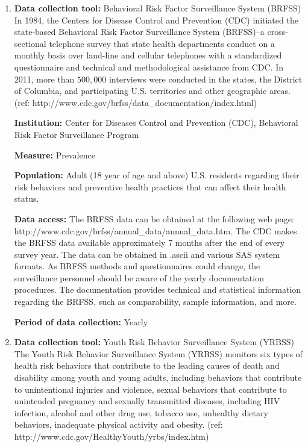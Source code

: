 \documentclass[12pt,letterpaper]{report}
\begin{document}
\begin{enumerate}

\item \textbf{Data collection tool:} Behavioral Risk Factor Surveillance System (BRFSS)  
\\In 1984, the Centers for Disease Control and Prevention (CDC) initiated the state-based Behavioral Risk Factor Surveillance System (BRFSS)--a cross-sectional telephone survey that state health departments conduct on a monthly basis over land-line and cellular telephones with a standardized questionnaire and technical and methodological assistance from CDC. 
	In 2011, more than $500,000$ interviews were conducted in the states, the District of Columbia, and participating U.S. territories and other geographic areas.
(ref: http://www.cdc.gov/brfss/data\_documentation/index.html)
	
	\textbf{Institution:} Center for Diseases Control and Prevention (CDC), Behavioral Risk Factor Surveillance Program
	
	\textbf{Measure:} Prevalence

	\textbf{Population:} Adult (18 year of age and above) U.S. residents regarding their risk behaviors and preventive health practices that can affect their health status.

	\textbf{Data access:} The BRFSS data can be obtained at the following web page:\\
	 http://www.cdc.gov/brfss/annual\_data/annual\_data.htm.
 The CDC makes the BRFSS data available approximately 7 months after the end of every survey year. The data can be obtained in .ascii and various SAS system formats. As BRFSS methods and questionnaires could change, the surveillance personnel should be aware of the yearly documentation procedures. The documentation provides technical and statistical information regarding the BRFSS, such as comparability, sample information, and more.
		
	\textbf{Period of data collection:}  Yearly

\item \textbf{Data collection tool:} Youth Risk Behavior Surveillance System (YRBSS)
\\The Youth Risk Behavior Surveillance System (YRBSS) monitors six types of health risk behaviors that contribute to the leading causes of death and disability among youth and young adults, including behaviors that contribute to unintentional injuries and violence, sexual behaviors that contribute to unintended pregnancy and sexually transmitted diseases, including HIV infection, alcohol and other drug use, tobacco use,  unhealthy dietary behaviors, inadequate physical activity and obesity. (ref: http://www.cdc.gov/HealthyYouth/yrbs/index.htm)	


\end{enumerate}
\end{document}
